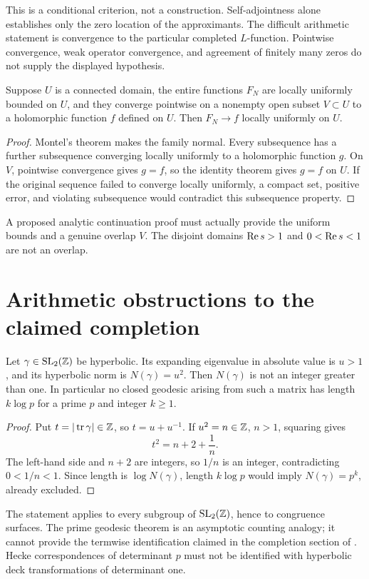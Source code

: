 \begin{remark}
This is a conditional criterion, not a construction. Self-adjointness alone
establishes only the zero location of the approximants. The difficult arithmetic
statement is convergence to the particular completed $L$-function.
Pointwise convergence, weak operator convergence, and agreement of finitely
many zeros do not supply the displayed hypothesis.
\end{remark}

\begin{proposition}\label{prop:normal}
Suppose $U$ is a connected domain, the entire functions $F_N$ are locally
uniformly bounded on $U$, and they converge pointwise on a nonempty open
subset $V\subset U$ to a holomorphic function $f$ defined on $U$.
Then $F_N\to f$ locally uniformly on $U$.
\end{proposition}
\begin{proof}
Montel's theorem makes the family normal. Every subsequence has a further
subsequence converging locally uniformly to a holomorphic function $g$.
On $V$, pointwise convergence gives $g=f$, so the identity theorem gives
$g=f$ on $U$. If the original sequence failed to converge locally uniformly,
a compact set, positive error, and violating subsequence would contradict
this subsequence property.
\end{proof}
A proposed analytic continuation proof must actually provide the uniform
bounds and a genuine overlap $V$. The disjoint domains $\operatorname{Re} s>1$ and
$0<\operatorname{Re} s<1$ are not an overlap.

\section{Arithmetic obstructions to the claimed completion}
\begin{theorem}\label{thm:norm}
Let $\gamma\in\mathrm{SL}_2(\mathbb Z)$ be hyperbolic. Its expanding eigenvalue
in absolute value is $u>1$, and its hyperbolic norm is $N(\gamma)=u^2$.
Then $N(\gamma)$ is not an integer greater than one. In particular no
closed geodesic arising from such a matrix has length $k\log p$ for a
prime $p$ and integer $k\ge1$.
\end{theorem}
\begin{proof}
Put $t=|\operatorname{tr}\gamma|\in\mathbb Z$, so $t=u+u^{-1}$.
If $u^2=n\in\mathbb Z$, $n>1$, squaring gives
\[
 t^2=n+2+\frac1n.
\]
The left-hand side and $n+2$ are integers, so $1/n$ is an integer,
contradicting $0<1/n<1$. Since length is $\log N(\gamma)$,
length $k\log p$ would imply $N(\gamma)=p^k$, already excluded.
\end{proof}
The statement applies to every subgroup of $\mathrm{SL}_2(\mathbb Z)$, hence to
congruence surfaces. The prime geodesic theorem is an asymptotic counting
analogy; it cannot provide the termwise identification claimed in the
completion section of \cite{surface}. Hecke correspondences of determinant
$p$ must not be identified with hyperbolic deck transformations of determinant one.

